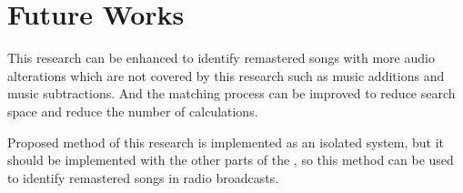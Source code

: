 \section{Future Works}

This research can be enhanced to identify remastered songs with more
audio alterations which are not covered by this research such as music
additions and music subtractions. And the matching process can be improved
to reduce search space and reduce the number of calculations.

Proposed method of this research is implemented as an isolated system, but
it should be implemented with the other parts of the \cite{Nishan}, so this method can
be used to identify remastered songs in radio broadcasts.  